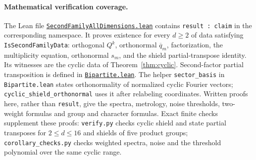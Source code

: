 \documentclass[11pt]{article}
\begin{document}
\paragraph{Mathematical verification coverage.}
The Lean file
\href{https://github.com/the-omega-institute/trureturing/blob/a2d277ea0980f1230eff2c7e27838372effccb30/D5/S3/Quantum/Entanglement/BoundEntanglement/SecondFamilyAllDimensions.lean}{\texttt{SecondFamilyAllDimensions.lean}}
contains \texttt{result : claim} in the corresponding namespace. It proves
existence for every $d\geq2$ of data satisfying
\texttt{IsSecondFamilyData}: orthogonal $Q^k$, orthonormal
$\overline q_m$, factorization, the multiplicity equation, orthonormal
$s_m$, and the shield partial-transpose identity.
Its witnesses are the cyclic data of Theorem~\ref{thm:cyclic}.
Second-factor partial transposition is defined in
\href{https://github.com/the-omega-institute/trureturing/blob/a2d277ea0980f1230eff2c7e27838372effccb30/D5/S3/Quantum/Entanglement/AbsolutePPT/Bipartite.lean}{\texttt{Bipartite.lean}}.
The helper \texttt{sector\_basis} in \texttt{Bipartite.lean} states
orthonormality of normalized cyclic Fourier vectors;
\texttt{cyclic\_shield\_orthonormal}
uses it after relabeling coordinates.
Written proofs here, rather than \texttt{result}, give the spectra,
metrology, noise thresholds, two-weight formulas and group and character
formulas. Exact finite checks supplement these proofs:
\texttt{verify.py} checks cyclic shield and state partial transposes for
$2\leq d\leq16$ and shields of five product groups;
\texttt{corollary\_checks.py} checks weighted spectra, noise and the threshold
polynomial over the same cyclic range.
\end{document}
